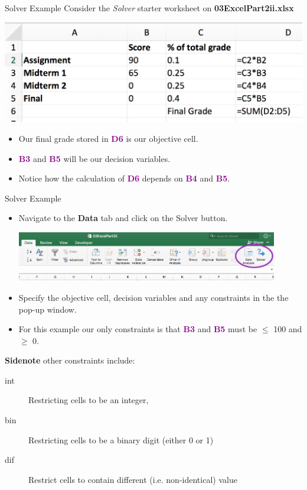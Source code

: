 \documentclass[xcolor=svgnames, handout]{beamer}
\newcommand{\cell}[1]{{\sf \textbf{\textcolor{DarkMagenta}{#1}}}}
\begin{document}
\begin{frame}{Solver Example}
 Consider the \textit{Solver} starter worksheet on {\bf 03ExcelPart2ii.xlsx}
\begin{center}
\includegraphics[height=0.3\textwidth]{solverF}
\end{center}
\begin{itemize}
\item Our final grade stored in \cell{D6} is our objective cell.  
\item \cell{B3} and \cell{B5} will be our decision variables.
\item Notice how the calculation of \cell{D6} depends on \cell{B4} and \cell{B5}.
\end{itemize}
\end{frame}

\begin{frame}{Solver Example}
\begin{itemize}
\item Navigate to the {\bf Data} tab and click on the Solver button.
\begin{center}
\includegraphics[width=0.9\textwidth]{addins}
\end{center}
\item Specify the objective cell, decision variables and any constraints in the the  pop-up window.
\medskip
\item For this example our only constraints is that  \cell{B3} and \cell{B5} must be $\leq$ 100 and $\geq$ 0.
\end{itemize}
{\bf Sidenote} other constraints include:
\begin{description}
\item[int] Restricting cells to be an integer,
\item[bin] Restricting cells to be a binary digit (either 0 or 1)
\item[dif] Restrict cells to contain different (i.e. non-identical) value
\end{description}
\end{frame}
\end{document}

